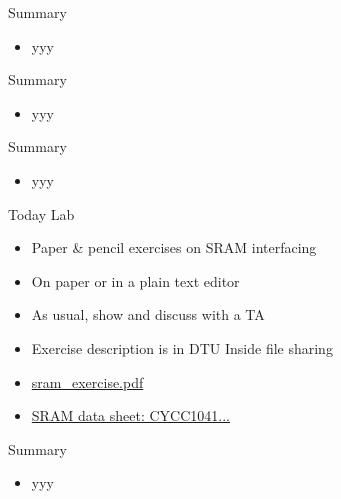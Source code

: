 \begin{frame}[fragile]{Summary}
\begin{itemize}
\item yyy
\end{itemize}
\end{frame}

\begin{frame}[fragile]{Summary}
\begin{itemize}
\item yyy
\end{itemize}
\end{frame}


\begin{frame}[fragile]{Summary}
\begin{itemize}
\item yyy
\end{itemize}
\end{frame}

\begin{frame}[fragile]{Today Lab}
\begin{itemize}
\item Paper \& pencil exercises on SRAM interfacing
\item On paper or in a plain text editor
\item As usual, show and discuss with a TA
\item Exercise description is in DTU Inside file sharing
\item \href{https://cn.inside.dtu.dk/cnnet/filesharing/download/39a98e6a-f453-4aa7-98c4-cb13eae6c805}{sram\_exercise.pdf}
\item \href{https://cn.inside.dtu.dk/cnnet/filesharing/download/618360ca-01b4-42e4-86e2-765835963deb}{SRAM data sheet: CYCC1041...}
\end{itemize}
\end{frame}

\begin{frame}[fragile]{Summary}
\begin{itemize}
\item yyy
\end{itemize}
\end{frame}





